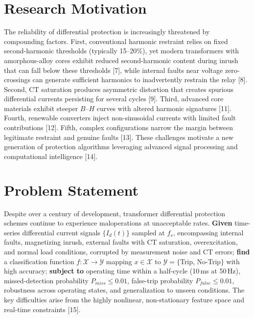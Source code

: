 \documentclass[12pt,a4paper,oneside]{report}
\begin{document}
\section{Research Motivation}
The reliability of differential protection is increasingly threatened by compounding factors. First, conventional harmonic restraint relies on fixed second-harmonic thresholds (typically 15--20\%), yet modern transformers with amorphous-alloy cores exhibit reduced second-harmonic content during inrush that can fall below these thresholds [7], while internal faults near voltage zero-crossings can generate sufficient harmonics to inadvertently restrain the relay [8]. Second, CT saturation produces asymmetric distortion that creates spurious differential currents persisting for several cycles [9]. Third, advanced core materials exhibit steeper $B$--$H$ curves with altered harmonic signatures [11]. Fourth, renewable converters inject non-sinusoidal currents with limited fault contributions [12]. Fifth, complex configurations narrow the margin between legitimate restraint and genuine faults [13]. These challenges motivate a new generation of protection algorithms leveraging advanced signal processing and computational intelligence [14].

\section{Problem Statement}
Despite over a century of development, transformer differential protection schemes continue to experience maloperations at unacceptable rates. \textbf{Given} time-series differential current signals $\{I_d(t)\}$ sampled at $f_s$, encompassing internal faults, magnetizing inrush, external faults with CT saturation, overexcitation, and normal load conditions, corrupted by measurement noise and CT errors; \textbf{find} a classification function $f:\mathcal{X}\!\to\!\mathcal{Y}$ mapping $x\in\mathcal{X}$ to $\mathcal{Y}=\{$Trip, No-Trip$\}$ with high accuracy; \textbf{subject to} operating time within a half-cycle (10\,ms at 50\,Hz), missed-detection probability $P_{miss}\le 0.01$, false-trip probability $P_{false}\le 0.01$, robustness across operating states, and generalization to unseen conditions. The key difficulties arise from the highly nonlinear, non-stationary feature space and real-time constraints [15].
\end{document}
